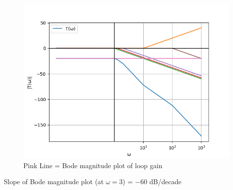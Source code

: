 \documentclass[journal,12pt,twocolumn]{IEEEtran}
\theoremstyle{remark}
\begin{document}
\begin{figure}[!h]
    \centering
    \includegraphics[width=\columnwidth]{2022/IN/53/figs/bode_mag_plot.png}
    \caption{Pink Line = Bode magnitude plot of loop gain}
\end{figure}

Slope of Bode magnitude plot (at $\omega=3$) = $-60$ dB/decade
\end{document}
